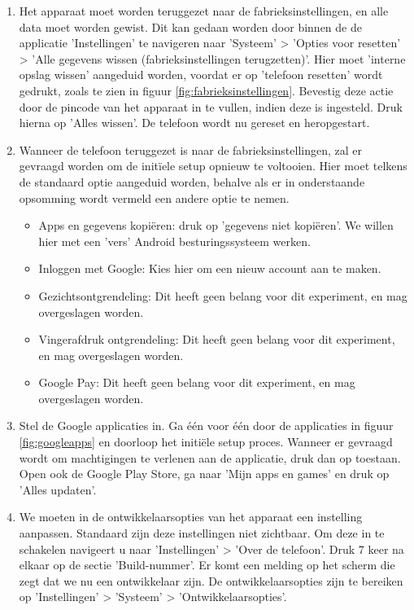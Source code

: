 \begin{enumerate}
    \item 
    \label{factoryreset}
    Het apparaat moet worden teruggezet naar de fabrieksinstellingen, en alle data moet worden gewist. Dit kan gedaan worden door binnen de de applicatie 'Instellingen' te navigeren naar 'Systeem' > 'Opties voor resetten' > 'Alle gegevens wissen (fabrieksinstellingen terugzetten)'. Hier moet 'interne opslag wissen' aangeduid worden, voordat er op 'telefoon resetten' wordt gedrukt, zoals te zien in figuur \ref{fig:fabrieksinstellingen}. Bevestig deze actie door de pincode van het apparaat in te vullen, indien deze is ingesteld. Druk hierna op 'Alles wissen'. De telefoon wordt nu gereset en heropgestart.
    \item 
    \label{initialsetup}
    Wanneer de telefoon teruggezet is naar de fabrieksinstellingen, zal er gevraagd worden om de initïele setup opnieuw te voltooien. Hier moet telkens de standaard optie aangeduid worden, behalve als er in onderstaande opsomming wordt vermeld een andere optie te nemen.
    \begin{itemize}
        \item Apps en gegevens kopiëren: druk op 'gegevens niet kopiëren'. We willen hier met een 'vers' Android besturingssysteem werken.
        \item Inloggen met Google: Kies hier om een nieuw account aan te maken.
        \item Gezichtsontgrendeling: Dit heeft geen belang voor dit experiment, en mag overgeslagen worden.
        \item Vingerafdruk ontgrendeling: Dit heeft geen belang voor dit experiment, en mag overgeslagen worden.
        \item Google Pay: Dit heeft geen belang voor dit experiment, en mag overgeslagen worden.
    \end{itemize}
    \item 
    \label{setupgoogleapps}
    Stel de Google applicaties in. Ga één voor één door de applicaties in figuur \ref{fig:googleapps} en doorloop  het initiële setup proces. Wanneer er gevraagd wordt om machtigingen te verlenen aan de applicatie, druk dan op toestaan. Open ook de Google Play Store, ga naar 'Mijn apps en games' en druk op 'Alles updaten'.
    \item 
    \label{developersettings}
    We moeten in de ontwikkelaarsopties van het apparaat een instelling aanpassen. Standaard zijn deze instellingen niet zichtbaar. Om deze in te schakelen navigeert u naar 'Instellingen' > 'Over de telefoon'. Druk 7 keer na elkaar op de sectie 'Build-nummer'. Er komt een melding op het scherm die zegt dat we nu een ontwikkelaar zijn. De ontwikkelaarsopties zijn te bereiken op 'Instellingen' > 'Systeem' > 'Ontwikkelaarsopties'.

\end{enumerate}
